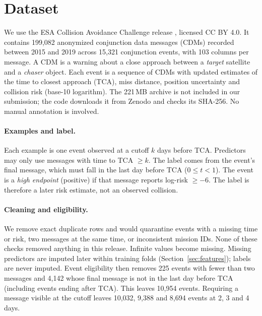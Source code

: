 
\section{Dataset}
\label{sec:dataset}

We use the ESA Collision Avoidance Challenge release \citep{esa2021dataset,uriot2022challenge}, licensed CC BY 4.0. It contains 199,082 anonymized conjunction data messages (CDMs) recorded between 2015 and 2019 \citep{uriot2022challenge} across 15,321 conjunction events, with 103 columns per message. A CDM is a warning about a close approach between a \emph{target} satellite and a \emph{chaser} object. Each event is a sequence of CDMs with updated estimates of the time to closest approach (TCA), miss distance, position uncertainty and collision risk (base-10 logarithm). The 221\,MB archive is not included in our submission; the code downloads it from Zenodo and checks its SHA-256. No manual annotation is involved.

\paragraph{Examples and label.} Each example is one event observed at a cutoff $k$ days before TCA. Predictors may only use messages with time to TCA $\geq k$. The label comes from the event's final message, which must fall in the last day before TCA ($0 \le t < 1$). The event is a \emph{high endpoint} (positive) if that message reports log-risk $\geq -6$. The label is therefore a later risk estimate, not an observed collision.

\paragraph{Cleaning and eligibility.} We remove exact duplicate rows and would quarantine events with a missing time or risk, two messages at the same time, or inconsistent mission IDs. None of these checks removed anything in this release. Infinite values become missing. Missing predictors are imputed later within training folds (Section~\ref{sec:features}); labels are never imputed. Event eligibility then removes 225 events with fewer than two messages and 4,142 whose final message is not in the last day before TCA (including events ending after TCA). This leaves 10,954 events. Requiring a message visible at the cutoff leaves 10,032, 9,388 and 8,694 events at 2, 3 and 4 days.

